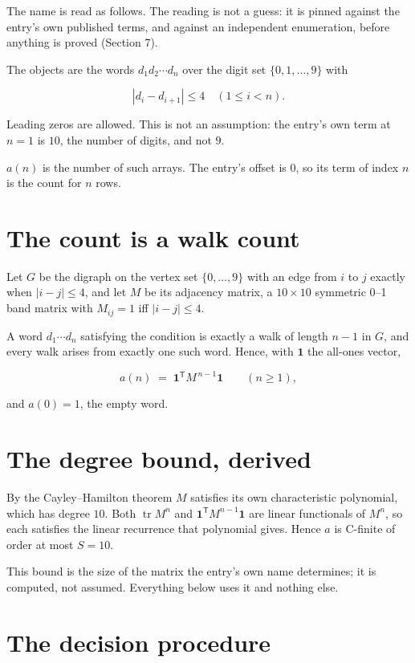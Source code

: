 \documentclass[11pt]{article}
\theoremstyle{definition}
\begin{document}
The name is read as follows. The reading is not a guess: it is pinned against the entry's own published terms, and against an independent enumeration, before anything is proved (Section 7).

The objects are the words $d_1 d_2 \cdots d_n$ over the digit set $\{0,1,\dots,9\}$ with

\[|d_i - d_{i+1}| \le 4\quad (1 \le i < n).\]

Leading zeros are allowed. This is not an assumption: the entry's own term at $n=1$ is $10$, the number of digits, and not $9$.

$a(n)$ is the number of such arrays. The entry's offset is 0, so its term of index $n$ is the count for $n$ rows.

\section{The count is a walk count}

Let $G$ be the digraph on the vertex set $\{0,\dots,9\}$ with an edge from $i$ to $j$ exactly when $|i-j| \le 4$, and let $M$ be its adjacency matrix, a $10 \times 10$ symmetric 0--1 band matrix with $M_{ij} = 1$ iff $|i-j| \le 4$.

A word $d_1\cdots d_n$ satisfying the condition is exactly a walk of length $n-1$ in $G$, and every walk arises from exactly one such word. Hence, with $\mathbf 1$ the all-ones vector,

\[a(n) \;=\; \mathbf 1^{\mathsf T} M^{\,n-1} \mathbf 1 \qquad (n \ge 1),\]

and $a(0) = 1$, the empty word.

\section{The degree bound, derived}

By the Cayley--Hamilton theorem $M$ satisfies its own characteristic polynomial, which has degree $10$. Both $\operatorname{tr} M^n$ and $\mathbf 1^{\mathsf T} M^{n-1} \mathbf 1$ are linear functionals of $M^{n}$, so each satisfies the linear recurrence that polynomial gives. Hence $a$ is C-finite of order at most $S = 10$.

This bound is the size of the matrix the entry's own name determines; it is computed, not assumed. Everything below uses it and nothing else.

\section{The decision procedure}
\end{document}
